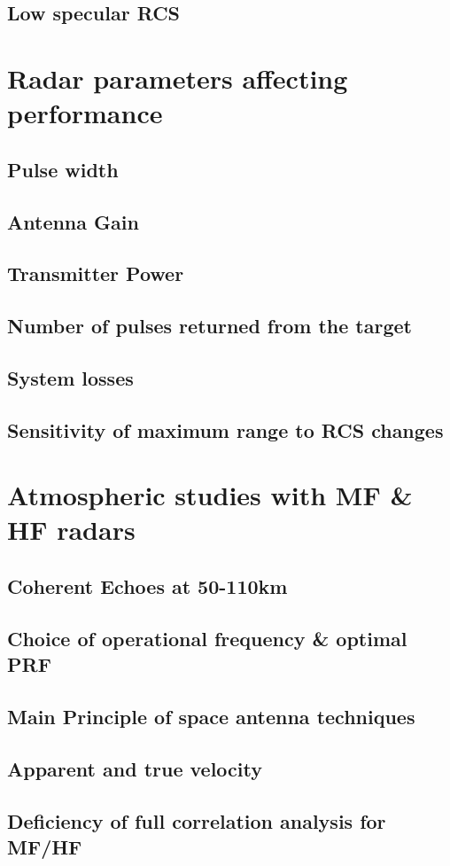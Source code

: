 \subsection{Low specular RCS}


\section{Radar parameters affecting performance}

\subsection{Pulse width}

\subsection{Antenna Gain}

\subsection{Transmitter Power}

\subsection{Number of pulses returned from the target}

\subsection{System losses}

\subsection{Sensitivity of maximum range to RCS changes}

\section{Atmospheric studies with MF \& HF radars}

\subsection{Coherent Echoes at 50-110km}

\subsection{Choice of operational frequency \& optimal PRF}

\subsection{Main Principle of space antenna techniques}

\subsection{Apparent and true velocity}

\subsection{Deficiency of full correlation analysis for MF/HF}

